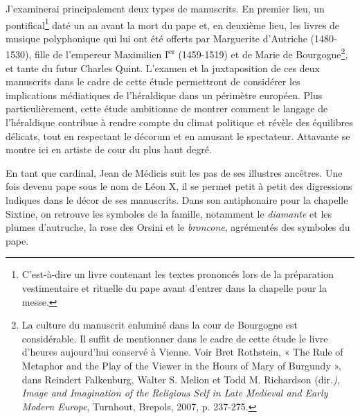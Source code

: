 \documentclass[12pt,twoside,openany]{book}
\begin{document}
J’examinerai principalement deux types de manuscrits. En premier lieu, un pontifical\footnote{C’est-à-dire un livre contenant les textes prononcés lors de la préparation vestimentaire et rituelle du pape avant d’entrer dans la chapelle pour la messe.} daté un an avant la mort du pape et, en deuxième lieu, les livres de musique polyphonique qui lui ont été offerts par Marguerite d’Autriche (1480-1530), fille de l’empereur Maximilien I\textsuperscript{er} (1459-1519) et de Marie de Bourgogne\footnote{La culture du manuscrit enluminé dans la cour de Bourgogne est considérable. Il suffit de mentionner dans le cadre de cette étude le livre d’heures aujourd’hui conservé à Vienne. Voir Bret Rothstein, « The Rule of Metaphor and the Play of the Viewer in the Hours of Mary of Burgundy », dans Reindert Falkenburg, Walter S. Melion et Todd M. Richardson (dir\textit{.), Image and Imagination of the Religious Self in Late Medieval and Early Modern Europe}, Turnhout, Brepols, 2007, p. 237-275.}, et tante du futur Charles Quint. L’examen et la juxtaposition de ces deux manuscrits dans le cadre de cette étude permettront de considérer les implications médiatiques de l’héraldique dans un périmètre européen. Plus particulièrement, cette étude ambitionne de montrer comment le langage de l’héraldique contribue à rendre compte du climat politique et révèle des équilibres délicats, tout en respectant le décorum et en amusant le spectateur. Attavante se montre ici en artiste de cour du plus haut degré.

En tant que cardinal, Jean de Médicis suit les pas de ses illustres ancêtres. Une fois devenu pape sous le nom de Léon X, il se permet petit à petit des digressions ludiques dans le décor de ses manuscrits. Dans son antiphonaire pour la chapelle Sixtine, on retrouve les symboles de la famille, notamment le \textit{diamante} et les plumes d’autruche, la rose des Orsini et le \textit{broncone}, agrémentés des symboles du pape.
\end{document}
